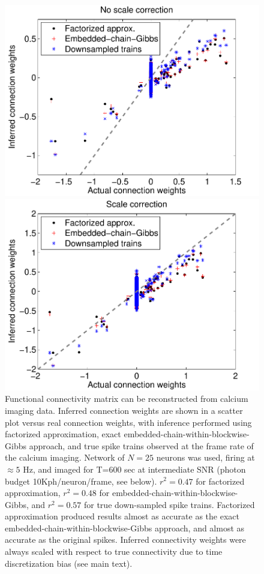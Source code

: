\begin{figure}[h]
\centering
\begin{minipage}[c]{0.45\hsize}
\includegraphics[width=\hsize]{../figs/FigureA3_scatter_three}
\end{minipage}
\begin{minipage}[c]{0.45\hsize}
\includegraphics[width=\hsize]{../figs/FigureA3_scatter_three_corrected}
\end{minipage}
\caption{Functional connectivity matrix can be reconstructed from calcium imaging data.
Inferred connection weights are shown in a scatter plot versus real connection weights, with inference performed using factorized approximation, exact embedded-chain-within-blockwise-Gibbs approach, and true spike trains observed at the frame rate of the calcium imaging. Network of $N=25$ neurons was used, firing at $\approx 5$ Hz, and imaged for T=600 sec at intermediate SNR (photon budget 10Kph/neuron/frame, see below). $r^2=0.47$ for factorized approximation, $r^2=0.48$ for embedded-chain-within-blockwise-Gibbs, and $r^2=0.57$ for true down-sampled spike trains. Factorized approximation produced results almost as accurate as the exact embedded-chain-within-blockwise-Gibbs approach, and almost as accurate as the original spikes. Inferred connectivity weights were always scaled with respect to true connectivity due to time discretization bias (see main text).
}
\end{figure}
